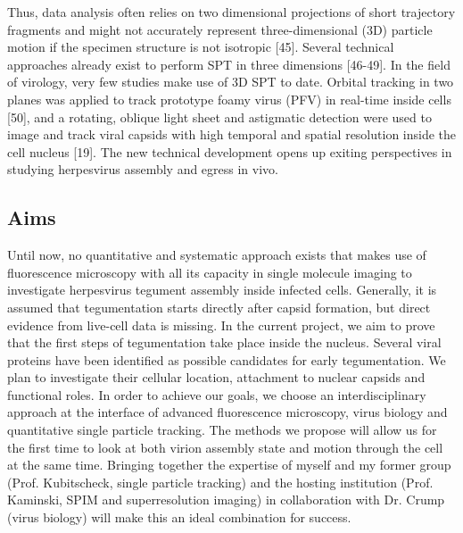 Thus, data analysis often relies on two dimensional projections of short trajectory fragments and might not accurately represent three-dimensional (3D) particle motion if the specimen structure is not isotropic [45].
Several technical approaches already exist to perform SPT in three dimensions [46-49].
In the field of virology, very few studies make use of 3D SPT to date.
Orbital tracking in two planes was applied to track prototype foamy virus (PFV) in real-time inside cells [50], and a rotating, oblique light sheet and astigmatic detection were used to image and track viral capsids with high temporal and spatial resolution inside the cell nucleus [19].
The new technical development opens up exiting perspectives in studying herpesvirus assembly and egress in vivo.

\subsection{Aims}
Until now, no quantitative and systematic approach exists that makes use of fluorescence microscopy with all its capacity in single molecule imaging to investigate herpesvirus tegument assembly inside infected cells.
Generally, it is assumed that tegumentation starts directly after capsid formation, but direct evidence from live-cell data is missing.
In the current project, we aim to prove that the first steps of tegumentation take place inside the nucleus.
Several viral proteins have been identified as possible candidates for early tegumentation.
We plan to investigate their cellular location, attachment to nuclear capsids and functional roles.
In order to achieve our goals, we choose an interdisciplinary approach at the interface of advanced fluorescence microscopy, virus biology and quantitative single particle tracking.
The methods we propose will allow us for the first time to look at both virion assembly state and motion through the cell at the same time.
Bringing together the expertise of myself and my former group (Prof. Kubitscheck, single particle tracking) and the hosting institution (Prof. Kaminski, SPIM and superresolution imaging) in collaboration with Dr. Crump (virus biology) will make this an ideal combination for success.

